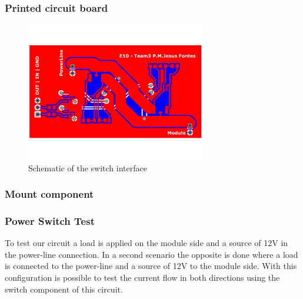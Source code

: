\subsubsection{Printed circuit board}

\begin{figure}[H]
	\begin{centering}
		 \includegraphics[width=0.7\textwidth,page=1]{images/ps_layout.pdf}
		\caption{Schematic of the switch interface}
	\end{centering}
\end{figure}

\subsubsection{Mount component}

\begin{figure}[H]
	\begin{centering}
	\end{centering}
\end{figure}

\subsubsection{Power Switch Test}
To test our circuit a load is applied on the module side and a source of 12V in the power-line connection. In a second scenario the opposite is done where a load is connected to the power-line and a source of 12V to the module side.
With this configuration is possible to test the current flow in both directions using the switch component of this circuit.
